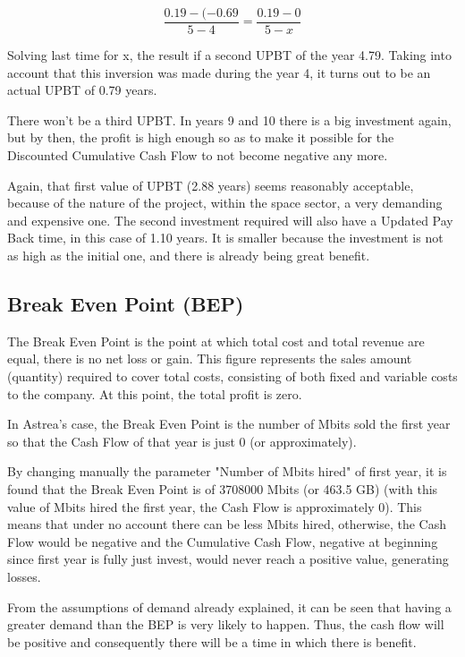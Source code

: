 \begin{equation}
\frac{0.19-(-0.69}{5-4}=\frac{0.19-0}{5-x}
\end{equation}

Solving last time for x, the result if a second UPBT of the year 4.79. Taking into account that this inversion was made during the year 4, it turns out to be an actual UPBT of 0.79 years.

There won't be a third UPBT. In years 9 and 10 there is a big investment again, but by then, the profit is high enough so as to make it possible for the Discounted Cumulative Cash Flow to not become negative any more. 

Again, that first value of UPBT (2.88 years) seems reasonably acceptable, because of the nature of the project, within the space sector, a very demanding and expensive one. The second investment required will also have a Updated Pay Back time, in this case of 1.10 years. It is smaller because the investment is not as high as the initial one, and there is already being great benefit. 

\subsection{Break Even Point (BEP)}
The Break Even Point is the point at which total cost and total revenue are equal, there is no net loss or gain. This figure represents the sales amount (quantity) required to cover total costs, consisting of both fixed and variable costs to the company. At this point, the total profit is zero. 

In Astrea's case, the Break Even Point is the number of Mbits sold the first year so that the Cash Flow of that year is just 0 (or approximately). 

By changing manually the parameter "Number of Mbits hired" of first year, it is found that the Break Even Point is of 3708000 Mbits (or 463.5 GB) (with this value of Mbits hired the first year, the Cash Flow is approximately 0). This means that under no account there can be less Mbits hired, otherwise, the Cash Flow would be negative and the Cumulative Cash Flow, negative at beginning since first year is fully just invest, would never reach a positive value, generating losses. 

From the assumptions of demand already explained, it can be seen that having a greater demand than the BEP is very likely to happen. Thus, the cash flow will be positive and consequently there will be a time in which there is benefit.

